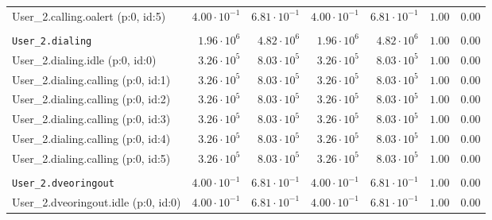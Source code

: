 \begin{table}[htbp]
{\begin{tabular}{lrrrrrr}
\hspace{3mm}User\_2.calling.oalert (p:0, id:5)       & $4.00 \cdot 10^{-1}$ & $6.81 \cdot 10^{-1}$ & $4.00 \cdot 10^{-1}$ & $6.81 \cdot 10^{-1}$ &               $1.00$ &               $0.00$ \\
\\[-8pt]\texttt{User\_2.dialing}                     &  $1.96 \cdot 10^{6}$ &  $4.82 \cdot 10^{6}$ &  $1.96 \cdot 10^{6}$ &  $4.82 \cdot 10^{6}$ &               $1.00$ &               $0.00$ \\
\hspace{3mm}User\_2.dialing.idle (p:0, id:0)         &  $3.26 \cdot 10^{5}$ &  $8.03 \cdot 10^{5}$ &  $3.26 \cdot 10^{5}$ &  $8.03 \cdot 10^{5}$ &               $1.00$ &               $0.00$ \\
\hspace{3mm}User\_2.dialing.calling (p:0, id:1)      &  $3.26 \cdot 10^{5}$ &  $8.03 \cdot 10^{5}$ &  $3.26 \cdot 10^{5}$ &  $8.03 \cdot 10^{5}$ &               $1.00$ &               $0.00$ \\
\hspace{3mm}User\_2.dialing.calling (p:0, id:2)      &  $3.26 \cdot 10^{5}$ &  $8.03 \cdot 10^{5}$ &  $3.26 \cdot 10^{5}$ &  $8.03 \cdot 10^{5}$ &               $1.00$ &               $0.00$ \\
\hspace{3mm}User\_2.dialing.calling (p:0, id:3)      &  $3.26 \cdot 10^{5}$ &  $8.03 \cdot 10^{5}$ &  $3.26 \cdot 10^{5}$ &  $8.03 \cdot 10^{5}$ &               $1.00$ &               $0.00$ \\
\hspace{3mm}User\_2.dialing.calling (p:0, id:4)      &  $3.26 \cdot 10^{5}$ &  $8.03 \cdot 10^{5}$ &  $3.26 \cdot 10^{5}$ &  $8.03 \cdot 10^{5}$ &               $1.00$ &               $0.00$ \\
\hspace{3mm}User\_2.dialing.calling (p:0, id:5)      &  $3.26 \cdot 10^{5}$ &  $8.03 \cdot 10^{5}$ &  $3.26 \cdot 10^{5}$ &  $8.03 \cdot 10^{5}$ &               $1.00$ &               $0.00$ \\
\\[-8pt]\texttt{User\_2.dveoringout}                 & $4.00 \cdot 10^{-1}$ & $6.81 \cdot 10^{-1}$ & $4.00 \cdot 10^{-1}$ & $6.81 \cdot 10^{-1}$ &               $1.00$ &               $0.00$ \\
\hspace{3mm}User\_2.dveoringout.idle (p:0, id:0)     & $4.00 \cdot 10^{-1}$ & $6.81 \cdot 10^{-1}$ & $4.00 \cdot 10^{-1}$ & $6.81 \cdot 10^{-1}$ &               $1.00$ &               $0.00$ \\

\end{tabular}}
\end{table}
